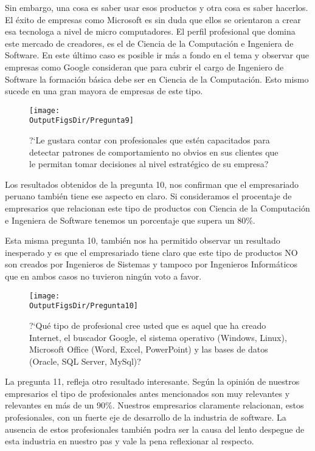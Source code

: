 Sin embargo, una cosa es saber usar esos productos y otra cosa es saber hacerlos. El éxito de empresas como Microsoft es sin duda que ellos se orientaron a crear esa tecnolog­a a nivel de micro computadores. El perfil profesional que domina este mercado de creadores, es el de Ciencia de la Computación e Ingenier­a de Software. En este último caso es posible ir más a fondo en el tema y observar que empresas como Google consideran que para cubrir el cargo de Ingeniero de Software la formación básica debe ser en Ciencia de la Computación. Esto mismo sucede en una gran mayor­a de empresas de este tipo.

\begin{figure}[!h]
	\centering
	\texttt{[image: \\OutputFigsDir/Pregunta9]}
	\label{fig:Preg9}
	\caption{?`Le gustar­a contar con profesionales que estén capacitados para detectar patrones de comportamiento no obvios en sus clientes que le permitan tomar decisiones al nivel estratégico de su empresa?}
\end{figure}

Los resultados obtenidos de la pregunta 10, nos confirman que el empresariado peruano también tiene ese aspecto en claro. Si consideramos el procentaje de empresarios que relacionan este tipo de productos con Ciencia de la Computación e Ingenier­a de Software tenemos un porcentaje que supera un 80\%.

Esta misma pregunta 10, también nos ha permitido observar un resultado inesperado y es que el empresariado tiene claro que este tipo de productos NO son creados por Ingenieros de Sistemas y tampoco por Ingenieros Informáticos que en ambos casos no tuvieron ningún voto a favor.

\begin{figure}[!h]
	\centering
	\texttt{[image: \\OutputFigsDir/Pregunta10]}
	\label{fig:Preg10}
	\caption{?`Qué tipo de profesional cree usted que es aquel que ha creado Internet, el buscador Google, el sistema operativo (Windows, Linux), Microsoft Office (Word, Excel, PowerPoint) y las bases de datos (Oracle, SQL Server, MySql)?}
\end{figure}

La pregunta 11, refleja otro resultado interesante. Según la opinión de nuestros empresarios el tipo de profesionales antes mencionados son muy relevantes y relevantes en más de un 90\%. Nuestros empresarios claramente relacionan, estos profesionales, con un fuerte eje de desarrollo de la industria de software. La ausencia de estos profesionales también podr­a ser la causa del lento despegue de esta industria en nuestro pa­s y vale la pena reflexionar al respecto.

